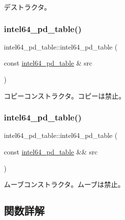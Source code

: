 デストラクタ。 \hypertarget{classintel64__pd__table_a5d230d6f3d9805067cd03448c4cabe70}{}\label{classintel64__pd__table_a5d230d6f3d9805067cd03448c4cabe70} 
\subsubsection{\texorpdfstring{intel64\+\_\+pd\+\_\+table()}{intel64\_pd\_table()}\hspace{0.1cm}{\footnotesize\ttfamily [2/3]}}
{\footnotesize\ttfamily intel64\+\_\+pd\+\_\+table\+::intel64\+\_\+pd\+\_\+table (\begin{DoxyParamCaption}\item[{const \hyperlink{classintel64__pd__table}{intel64\+\_\+pd\+\_\+table} \&}]{src }\end{DoxyParamCaption})\hspace{0.3cm}{\ttfamily [delete]}}

コピーコンストラクタ。コピーは禁止。 \hypertarget{classintel64__pd__table_af79d6dd14067f953869cc165536745cd}{}\label{classintel64__pd__table_af79d6dd14067f953869cc165536745cd} 
\subsubsection{\texorpdfstring{intel64\+\_\+pd\+\_\+table()}{intel64\_pd\_table()}\hspace{0.1cm}{\footnotesize\ttfamily [3/3]}}
{\footnotesize\ttfamily intel64\+\_\+pd\+\_\+table\+::intel64\+\_\+pd\+\_\+table (\begin{DoxyParamCaption}\item[{const \hyperlink{classintel64__pd__table}{intel64\+\_\+pd\+\_\+table} \&\&}]{src }\end{DoxyParamCaption})\hspace{0.3cm}{\ttfamily [delete]}}

ムーブコンストラクタ。ムーブは禁止。 

\subsection{関数詳解}
\hypertarget{classintel64__pd__table_a2bb0f697a15f803d293d52469c5dae63}{}\label{classintel64__pd__table_a2bb0f697a15f803d293d52469c5dae63} 
